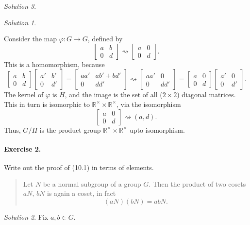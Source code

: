 \documentclass[11pt]{report}
\def\R{\mathbb{R}}
\theoremstyle{remark}
\newtheorem*{solution}{Solution}
\begin{document}
\begin{solution}
\begin{solution}
\begin{enumerate}
            Consider the map $\varphi\colon G \to G$, defined by \[
                \begin{bmatrix}
                    a & b \\ 0 & d
                \end{bmatrix} \rightsquigarrow \begin{bmatrix}
                    a & 0 \\ 0 & d
                \end{bmatrix}.
            \] This is a homomorphism, because \[
                \begin{bmatrix}
                    a & b \\ 0 & d
                \end{bmatrix} \begin{bmatrix}
                    a' & b' \\ 0 & d'
                \end{bmatrix} = \begin{bmatrix}
                    aa' & ab' + bd' \\ 0 & dd'
                \end{bmatrix} \rightsquigarrow \begin{bmatrix}
                    aa' & 0 \\ 0 & dd'
                \end{bmatrix} = \begin{bmatrix}
                    a & 0 \\ 0 & d
                \end{bmatrix} \begin{bmatrix}
                    a' & 0 \\ 0 & d'
                \end{bmatrix}.
            \] The kernel of $\varphi$ is $H$, and the image is the set of all
            ($2\times 2$) diagonal matrices. This in turn is isomorphic to $\R^\times
            \times \R^\times$,
            via the isomorphism \[
                \begin{bmatrix}
                    a & 0 \\ 0 & d
                \end{bmatrix} \rightsquigarrow (a, d).
            \] Thus, $G / H$ is the product group $\R^\times \times \R^\times$ upto
            isomorphism.
        \end{enumerate}
    \end{solution}

    \paragraph{Exercise 2.} Write out the proof of (10.1) in terms of elements.
    \begin{quote}
        Let $N$ be a normal subgroup of a group $G$. Then the product of two cosets
        $aN$, $bN$ is again a coset, in fact \[
            (aN)(bN) = abN.
        \]
    \end{quote}
    \begin{solution}
        Fix $a, b \in G$.


\end{solution}
\end{solution}
\end{document}
